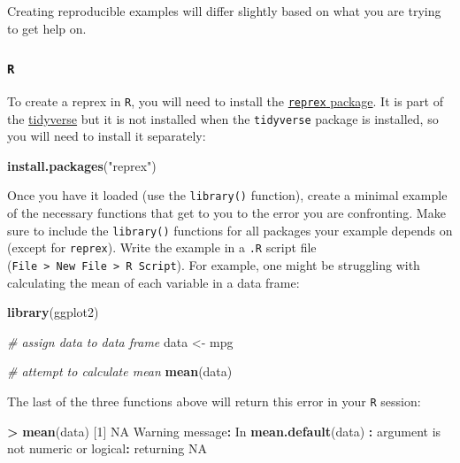 \documentclass[]{book}
\newenvironment{Shaded}{\begin{snugshade}}{\end{snugshade}}
\newcommand{\KeywordTok}[1]{\textcolor[rgb]{0.13,0.29,0.53}{\textbf{#1}}}
\newcommand{\DecValTok}[1]{\textcolor[rgb]{0.00,0.00,0.81}{#1}}
\newcommand{\StringTok}[1]{\textcolor[rgb]{0.31,0.60,0.02}{#1}}
\newcommand{\CommentTok}[1]{\textcolor[rgb]{0.56,0.35,0.01}{\textit{#1}}}
\newcommand{\OtherTok}[1]{\textcolor[rgb]{0.56,0.35,0.01}{#1}}
\newcommand{\OperatorTok}[1]{\textcolor[rgb]{0.81,0.36,0.00}{\textbf{#1}}}
\newcommand{\NormalTok}[1]{#1}
\theoremstyle{definition}
\theoremstyle{definition}
\theoremstyle{definition}
\theoremstyle{remark}
\begin{document}
Creating reproducible examples will differ slightly based on what you
are trying to get help on.

\subsubsection{\texorpdfstring{\texttt{R}}{R}}\label{r}

To create a reprex in \texttt{R}, you will need to install the
\href{http://reprex.tidyverse.org/}{\texttt{reprex} package}. It is part
of the \href{https://www.tidyverse.org}{tidyverse} but it is not
installed when the \texttt{tidyverse} package is installed, so you will
need to install it separately:

\begin{Shaded}
\begin{Highlighting}[]
\KeywordTok{install.packages}\NormalTok{(}\StringTok{"reprex"}\NormalTok{)}
\end{Highlighting}
\end{Shaded}

Once you have it loaded (use the \texttt{library()} function), create a
minimal example of the necessary functions that get to you to the error
you are confronting. Make sure to include the \texttt{library()}
functions for all packages your example depends on (except for
\texttt{reprex}). Write the example in a \texttt{.R} script file
(\texttt{File\ \textgreater{}\ New\ File\ \textgreater{}\ R\ Script}).
For example, one might be struggling with calculating the mean of each
variable in a data frame:

\begin{Shaded}
\begin{Highlighting}[]
\KeywordTok{library}\NormalTok{(ggplot2)}

\CommentTok{# assign data to data frame}
\NormalTok{data <-}\StringTok{ }\NormalTok{mpg}

\CommentTok{# attempt to calculate mean}
\KeywordTok{mean}\NormalTok{(data)}
\end{Highlighting}
\end{Shaded}

The last of the three functions above will return this error in your
\texttt{R} session:

\begin{Shaded}
\begin{Highlighting}[]
\OperatorTok{>}\StringTok{ }\KeywordTok{mean}\NormalTok{(data)}
\NormalTok{[}\DecValTok{1}\NormalTok{] }\OtherTok{NA}
\NormalTok{Warning message}\OperatorTok{:}
\NormalTok{In }\KeywordTok{mean.default}\NormalTok{(data) }\OperatorTok{:}\StringTok{ }\NormalTok{argument is not numeric or logical}\OperatorTok{:}\StringTok{ }\NormalTok{returning }\OtherTok{NA}
\end{Highlighting}
\end{Shaded}
\end{document}
